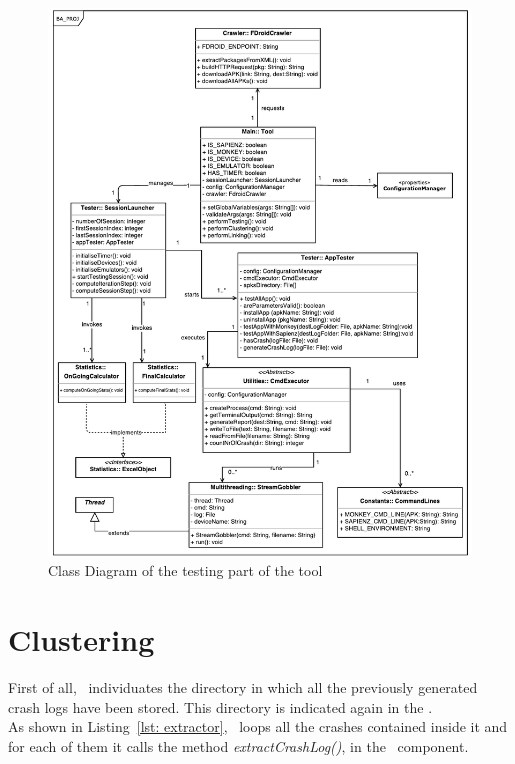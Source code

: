 \begin{figure}[H]
\centering 
\includegraphics[width=\columnwidth]{diagrams/testing.pdf} 
\caption{Class Diagram of the testing part of the tool }
\label{testing}
\vspace{-3mm} 
\end{figure}


\section{Clustering}
\label{tool: clustering}


First of all, \toolname\ individuates the directory in which all the previously generated crash logs have been stored. This directory is indicated again in the \Config.\\  
As shown in Listing~\ref{lst: extractor}, \toolname\ loops all the crashes contained inside it and for each of them it calls the method \textit{extractCrashLog()}, in the \Extractor\ component. 

